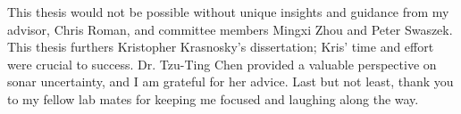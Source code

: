 This thesis would not be possible without unique insights and guidance from my advisor, Chris Roman, and committee members Mingxi Zhou and Peter Swaszek. This thesis furthers Kristopher Krasnosky's dissertation; Kris' time and effort were crucial to success. Dr. Tzu-Ting Chen provided a valuable perspective on sonar uncertainty, and I am grateful for her advice. Last but not least, thank you to my fellow lab mates for keeping me focused and laughing along the way. 
